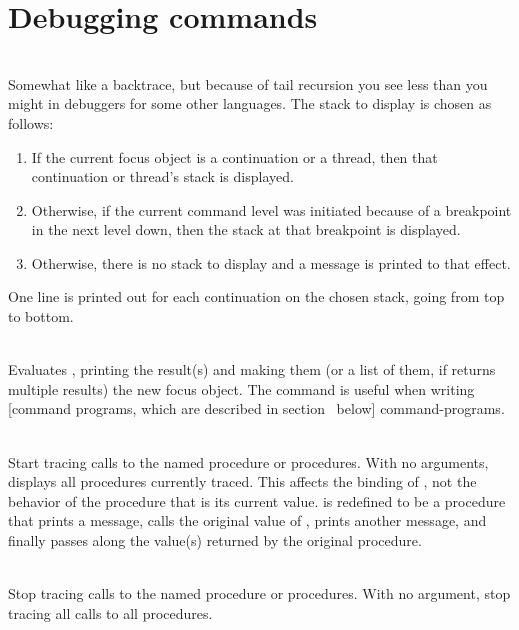 \section{Debugging commands}
\label{debug-commands}

\begin{description}
\item {}\\
    Somewhat like a backtrace, but because of tail recursion you see
    less than you might in debuggers for some other languages.
    The stack to display is chosen as follows:
\begin{enumerate}
    \item If the current focus object is a continuation or a thread,
       then that continuation or thread's stack is displayed.
    \item Otherwise, if the current command level was initiated because of
       a breakpoint in the next level down, then the stack at that
       breakpoint is displayed.
    \item Otherwise, there is no stack to display and a message is printed
       to that effect.
\end{enumerate}
    One line is printed out for each continuation on the chosen stack,
    going from top to bottom.

\item {}\\
    Evaluates , printing the result(s) and making them
    (or a list of them, if  returns multiple results)
    the new focus object.
    The  command is useful when writing
    [command programs, which are described in section~\Ref{} below]
    {command-programs}.

\item {}\\
    Start tracing calls to the named procedure or procedures.
    With no arguments, displays all procedures currently traced.
    This affects the binding of , not the behavior of the
    procedure that is its current value.   is redefined
    to be a procedure that prints a message,
    calls the original value of , prints another
    message, and finally passes along the value(s) returned by the
    original procedure.

\item {}\\
    Stop tracing calls to the named procedure or procedures.
    With no argument, stop tracing all calls to all procedures.


\end{description}
